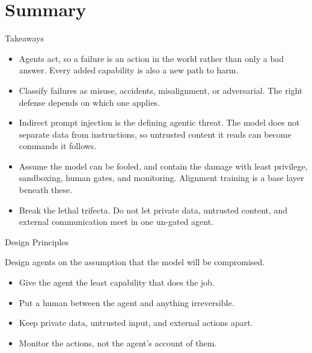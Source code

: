 \section{Summary}

\begin{frame}{Takeaways}
  \begin{itemize}\itemsep0.5em
    \item[\textcolor{KAred}{$\blacktriangleright$}] Agents act, so a failure is an action in the world rather than only a bad answer. Every added capability is also a new path to harm.
    \item[\textcolor{KAred}{$\blacktriangleright$}] Classify failures as misuse, accidents, misalignment, or adversarial. The right defense depends on which one applies.
    \item[\textcolor{KAred}{$\blacktriangleright$}] Indirect prompt injection is the defining agentic threat. The model does not separate data from instructions, so untrusted content it reads can become commands it follows.
    \item[\textcolor{KAred}{$\blacktriangleright$}] Assume the model can be fooled, and contain the damage with least privilege, sandboxing, human gates, and monitoring. Alignment training is a base layer beneath these.
    \item[\textcolor{KAred}{$\blacktriangleright$}] Break the lethal trifecta. Do not let private data, untrusted content, and external communication meet in one un-gated agent.
  \end{itemize}
\end{frame}

\begin{frame}{Design Principles}
  \begin{center}
    \vspace{0.5em}
    {\large Design agents on the assumption that the model will be compromised.}
  \end{center}
  \vspace{1em}
  \begin{itemize}\itemsep0.5em
    \item[\textcolor{KAred}{$\blacktriangleright$}] Give the agent the least capability that does the job.
    \item[\textcolor{KAred}{$\blacktriangleright$}] Put a human between the agent and anything irreversible.
    \item[\textcolor{KAred}{$\blacktriangleright$}] Keep private data, untrusted input, and external actions apart.
    \item[\textcolor{KAred}{$\blacktriangleright$}] Monitor the actions, not the agent's account of them.
  \end{itemize}
\end{frame}

